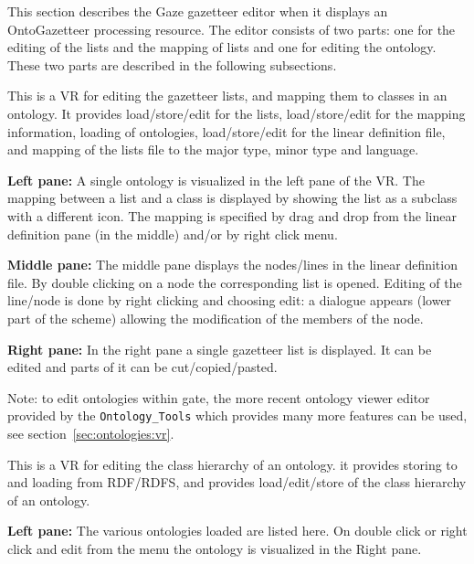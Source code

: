 This section describes the Gaze gazetteer editor when it displays
an OntoGazetteer processing resource. The editor consists of two
parts: one for the editing of the lists and the mapping of lists and
one for editing the ontology. These two parts are described in the 
following subsections.


This is a VR for editing the gazetteer lists, and mapping them to
classes in an ontology. It provides load/store/edit for the lists,
load/store/edit for the mapping information, loading of ontologies,
load/store/edit for the linear definition file, and mapping of the lists
file to the major type, minor type and language.

\textbf{Left pane:} A single ontology is visualized in the left pane of the VR. 
The mapping between a list and a class is displayed by showing the
list as a subclass with a different icon.
The mapping is specified by drag and drop from the linear definition
pane (in the middle) and/or by right click menu. 

\textbf{Middle pane:} The middle pane displays the nodes/lines in the
linear definition file. 
By double clicking on a node the corresponding list is opened. 
Editing of the line/node is done by right clicking and choosing
edit: a dialogue appears (lower part of the scheme) allowing the
modification of the members of the node. 

\textbf{Right pane:} In the right pane a single gazetteer list is
displayed. It can be edited and parts of it can be
cut/copied/pasted. 


Note: to edit ontologies within gate, the more recent ontology viewer editor
provided by the \texttt{Ontology\_Tools} which provides many more features 
can be used, see section~\ref{sec:ontologies:vr}. 

This is a VR for editing the class hierarchy of an ontology. it
provides storing to and loading from RDF/RDFS, and provides
load/edit/store of the class hierarchy of an ontology.

\textbf{Left pane:}
The various ontologies loaded are listed here. On double click or
right click and edit from the menu the ontology is visualized in the
Right pane. 
	
